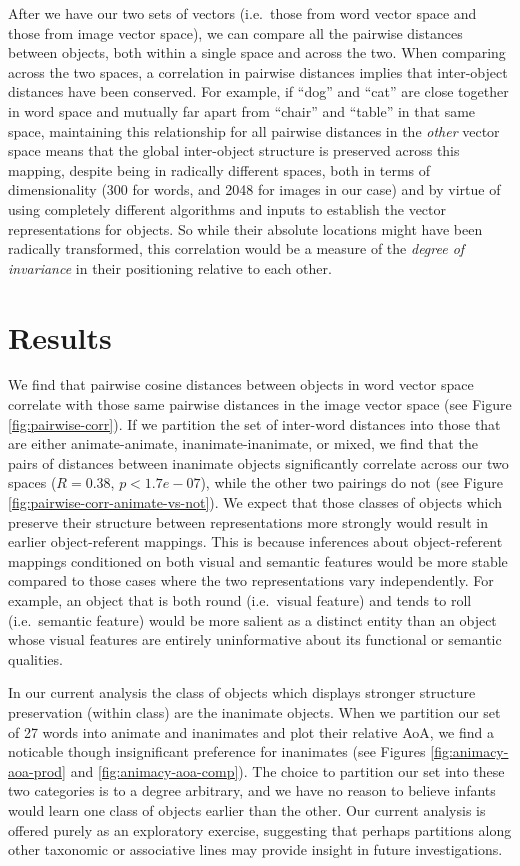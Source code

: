 \documentclass[10pt, letterpaper]{article}
\begin{document}
After we have our two sets of vectors (i.e.~those from word vector space
and those from image vector space), we can compare all the pairwise
distances between objects, both within a single space and across the
two. When comparing across the two spaces, a correlation in pairwise
distances implies that inter-object distances have been conserved. For
example, if ``dog'' and ``cat'' are close together in word space and
mutually far apart from ``chair'' and ``table'' in that same space,
maintaining this relationship for all pairwise distances in the
\textit{other} vector space means that the global inter-object structure
is preserved across this mapping, despite being in radically different
spaces, both in terms of dimensionality (300 for words, and 2048 for
images in our case) and by virtue of using completely different
algorithms and inputs to establish the vector representations for
objects. So while their absolute locations might have been radically
transformed, this correlation would be a measure of the
\textit{degree of invariance} in their positioning relative to each
other.

\section{Results}\label{results}

We find that pairwise cosine distances between objects in word vector
space correlate with those same pairwise distances in the image vector
space (see Figure \ref{fig:pairwise-corr}). If we partition the set of
inter-word distances into those that are either animate-animate,
inanimate-inanimate, or mixed, we find that the pairs of distances
between inanimate objects significantly correlate across our two spaces
(\(R = 0.38\), \(p < 1.7e-07\)), while the other two pairings do not
(see Figure \ref{fig:pairwise-corr-animate-vs-not}). We expect that
those classes of objects which preserve their structure between
representations more strongly would result in earlier object-referent
mappings. This is because inferences about object-referent mappings
conditioned on both visual and semantic features would be more stable
compared to those cases where the two representations vary
independently. For example, an object that is both round (i.e.~visual
feature) and tends to roll (i.e.~semantic feature) would be more salient
as a distinct entity than an object whose visual features are entirely
uninformative about its functional or semantic qualities.

In our current analysis the class of objects which displays stronger
structure preservation (within class) are the inanimate objects. When we
partition our set of 27 words into animate and inanimates and plot their
relative AoA, we find a noticable though insignificant preference for
inanimates (see Figures \ref{fig:animacy-aoa-prod} and
\ref{fig:animacy-aoa-comp}). The choice to partition our set into these
two categories is to a degree arbitrary, and we have no reason to
believe infants would learn one class of objects earlier than the other.
Our current analysis is offered purely as an exploratory exercise,
suggesting that perhaps partitions along other taxonomic or associative
lines may provide insight in future investigations.
\end{document}
